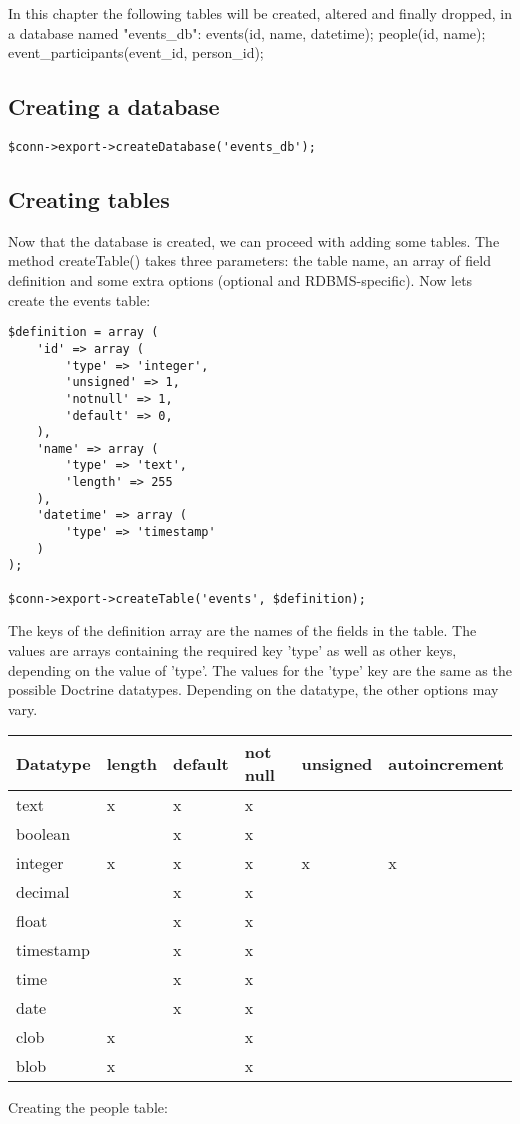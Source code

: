\documentclass[11pt,a4paper]{report}
\begin{document}
In this chapter the following tables will be created, altered and finally dropped, in a database named "events\_db":\newline
events(id, name, datetime);\newline
people(id, name);\newline
event\_participants(event\_id, person\_id);

\subsection{Creating a database}
\begin{verbatim}
$conn->export->createDatabase('events_db');
\end{verbatim}

\subsection{Creating tables}
Now that the database is created, we can proceed with adding some tables. The method createTable() takes three parameters: the table name, an array of field definition and some extra options (optional and RDBMS-specific). Now lets create the events table:

\begin{verbatim}
$definition = array (
    'id' => array (
        'type' => 'integer',
        'unsigned' => 1,
        'notnull' => 1,
        'default' => 0,
    ),
    'name' => array (
        'type' => 'text',
        'length' => 255
    ),
    'datetime' => array (
        'type' => 'timestamp'
    )
);

$conn->export->createTable('events', $definition);
\end{verbatim}

The keys of the definition array are the names of the fields in the table. The values are arrays containing the required key 'type' as well as other keys, depending on the value of 'type'. The values for the 'type' key are the same as the possible Doctrine datatypes. Depending on the datatype, the other options may vary.

\begin{tabular}{|l|l|l|l|l|l|}
\hline
Datatype & length & default & not null & unsigned & autoincrement\\
\hline
text & x & x & x &  & \\
\hline
boolean &  & x & x &  & \\
\hline
integer & x & x & x & x & x\\
\hline
decimal &  & x & x &  & \\
\hline
float &  & x & x &  & \\
\hline
timestamp &  & x & x &  & \\
\hline
time &  & x & x &  & \\
\hline
date &  & x & x &  & \\
\hline
clob & x &  & x &  & \\
\hline
blob & x &  & x &  & \\
\hline
\end{tabular}
Creating the people table:
\end{document}
